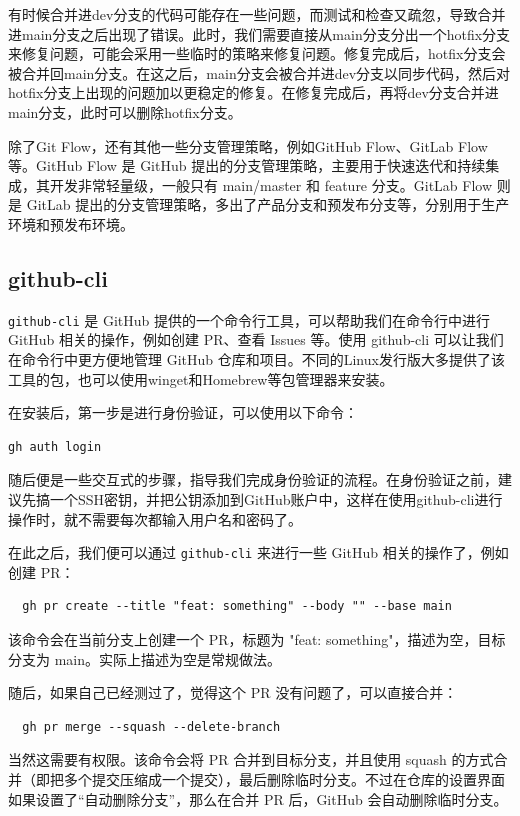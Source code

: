 有时候合并进dev分支的代码可能存在一些问题，而测试和检查又疏忽，导致合并进main分支之后出现了错误。此时，我们需要直接从main分支分出一个hotfix分支来修复问题，可能会采用一些临时的策略来修复问题。修复完成后，hotfix分支会被合并回main分支。在这之后，main分支会被合并进dev分支以同步代码，然后对hotfix分支上出现的问题加以更稳定的修复。在修复完成后，再将dev分支合并进main分支，此时可以删除hotfix分支。

除了Git Flow，还有其他一些分支管理策略，例如GitHub Flow、GitLab Flow等。GitHub Flow 是 GitHub 提出的分支管理策略，主要用于快速迭代和持续集成，其开发非常轻量级，一般只有 main/master 和 feature 分支。GitLab Flow 则是 GitLab 提出的分支管理策略，多出了产品分支和预发布分支等，分别用于生产环境和预发布环境。

\subsection{github-cli}

\verb|github-cli| 是 GitHub 提供的一个命令行工具，可以帮助我们在命令行中进行 GitHub 相关的操作，例如创建 PR、查看 Issues 等。使用 github-cli 可以让我们在命令行中更方便地管理 GitHub 仓库和项目。不同的Linux发行版大多提供了该工具的包，也可以使用winget和Homebrew等包管理器来安装。

在安装后，第一步是进行身份验证，可以使用以下命令：
\begin{verbatim}
gh auth login
\end{verbatim}
随后便是一些交互式的步骤，指导我们完成身份验证的流程。在身份验证之前，建议先搞一个SSH密钥，并把公钥添加到GitHub账户中，这样在使用github-cli进行操作时，就不需要每次都输入用户名和密码了。

在此之后，我们便可以通过 \verb|github-cli| 来进行一些 GitHub 相关的操作了，例如创建 PR：
\begin{verbatim}
  gh pr create --title "feat: something" --body "" --base main
\end{verbatim}
该命令会在当前分支上创建一个 PR，标题为 "feat: something"，描述为空，目标分支为 main。实际上描述为空是常规做法。

随后，如果自己已经测过了，觉得这个 PR 没有问题了，可以直接合并：
\begin{verbatim}
  gh pr merge --squash --delete-branch
\end{verbatim}
当然这需要有权限。该命令会将 PR 合并到目标分支，并且使用 squash 的方式合并（即把多个提交压缩成一个提交），最后删除临时分支。不过在仓库的设置界面如果设置了“自动删除分支”，那么在合并 PR 后，GitHub 会自动删除临时分支。

